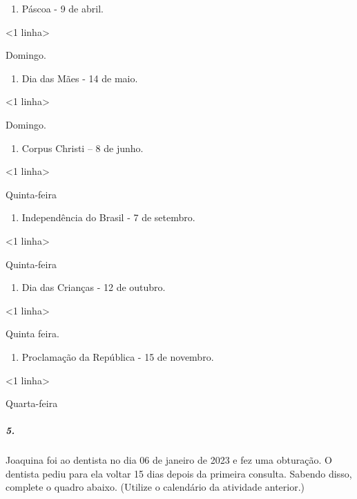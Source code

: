 \begin{enumerate}
\def\labelenumi{\alph{enumi})}
\item
  Páscoa - 9 de abril.
\end{enumerate}

\textless{}1 linha\textgreater{}

Domingo.

\begin{enumerate}
\def\labelenumi{\alph{enumi})}
\item
  Dia das Mães - 14 de maio.
\end{enumerate}

\textless{}1 linha\textgreater{}

Domingo.

\begin{enumerate}
\def\labelenumi{\alph{enumi})}
\item
  Corpus Christi -- 8 de junho.
\end{enumerate}

\textless{}1 linha\textgreater{}

Quinta-feira

\begin{enumerate}
\def\labelenumi{\alph{enumi})}
\item
  Independência do Brasil - 7 de setembro.
\end{enumerate}

\textless{}1 linha\textgreater{}

Quinta-feira

\begin{enumerate}
\def\labelenumi{\alph{enumi})}
\item
  Dia das Crianças - 12 de outubro.
\end{enumerate}

\textless{}1 linha\textgreater{}

Quinta feira.

\begin{enumerate}
\def\labelenumi{\alph{enumi})}
\item
  Proclamação da República - 15 de novembro.
\end{enumerate}

\textless{}1 linha\textgreater{}

Quarta-feira

\subparagraph{5.}\label{section-46}

Joaquina foi ao dentista no dia 06 de janeiro de 2023 e fez uma
obturação. O dentista pediu para ela voltar 15 dias depois da primeira
consulta. Sabendo disso, complete o quadro abaixo. (Utilize o calendário
da atividade anterior.)

